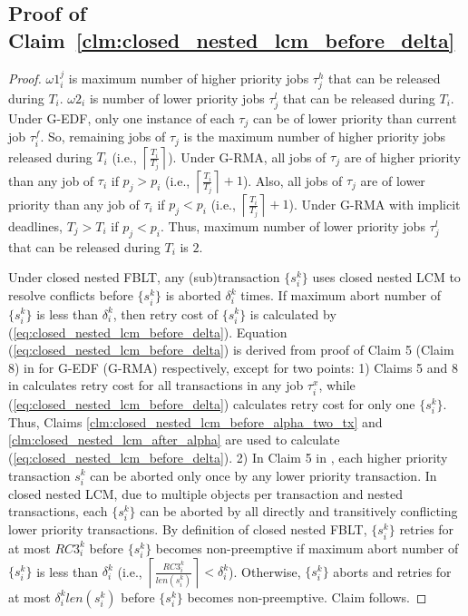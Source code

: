 \documentclass[letter]{sig-alternate}
\begin{document}
\subsection{\label{proof_clm:closed_nested_lcm_before_delta}Proof of Claim~\ref{clm:closed_nested_lcm_before_delta}}

\begin{proof}

$\omega1_{i}^{j}$ is maximum number of higher priority jobs $\tau_{j}^{h}$
that can be released during $T_{i}$. $\omega2_{i}$ is number of
lower priority jobs $\tau_{j}^{l}$ that can be released during $T_{i}$.
Under G-EDF, only one instance of each $\tau_{j}$ can be of lower
priority than current job $\tau_{i}^{f}$. So, remaining jobs of $\tau_{j}$
is the maximum number of higher priority jobs released during $T_{i}$
(i.e., $\left\lceil \frac{T_{i}}{T_{j}}\right\rceil $). Under G-RMA,
all jobs of $\tau_{j}$ are of higher priority than any job of $\tau_{i}$
if $p_{j}>p_{i}$ (i.e., $\left\lceil \frac{T_{i}}{T_{j}}\right\rceil +1$).
Also, all jobs of $\tau_{j}$ are of lower priority than any job of
$\tau_{i}$ if $p_{j}<p_{i}$ (i.e., $\left\lceil \frac{T_{i}}{T_{j}}\right\rceil +1$).
Under G-RMA with implicit deadlines, $T_{j}>T_{i}$ if $p_{j}<p_{i}$.
Thus, maximum number of lower priority jobs $\tau_{j}^{l}$ that can
be released during $T_{i}$ is $2$.

Under closed nested FBLT, any (sub)transaction $\{s_{i}^{k}\}$ uses
closed nested LCM to resolve conflicts before $\{s_{i}^{k}\}$ is
aborted $\delta_{i}^{k}$ times. If maximum abort number of $\{s_{i}^{k}\}$
is less than $\delta_{i}^{k}$, then retry cost of $\{s_{i}^{k}\}$
is calculated by (\ref{eq:closed_nested_lcm_before_delta}). Equation
(\ref{eq:closed_nested_lcm_before_delta}) is derived from proof of
Claim 5 (Claim 8) in \cite{lcmdac2012} for G-EDF (G-RMA) respectively,
except for two points: 1) Claims 5 and 8 in \cite{lcmdac2012} calculates
retry cost for all transactions in any job $\tau_{i}^{x}$, while
(\ref{eq:closed_nested_lcm_before_delta}) calculates retry cost for
only one $\{s_{i}^{k}\}$. Thus, Claims \ref{clm:closed_nested_lcm_before_alpha_two_tx}
and \ref{clm:closed_nested_lcm_after_alpha} are used to calculate
(\ref{eq:closed_nested_lcm_before_delta}). 2) In Claim 5 in \cite{lcmdac2012},
each higher priority transaction $s_{i}^{k}$ can be aborted only
once by any lower priority transaction. In closed nested LCM, due
to multiple objects per transaction and nested transactions, each
$\{s_{i}^{k}\}$ can be aborted by all directly and transitively conflicting
lower priority transactions. By definition of closed nested FBLT,
$\{s_{i}^{k}\}$ retries for at most $RC3_{i}^{k}$ before $\{s_{i}^{k}\}$
becomes non-preemptive if maximum abort number of $\{s_{i}^{k}\}$
is less than $\delta_{i}^{k}$ (i.e., $\left\lceil \frac{RC3_{i}^{k}}{len\left(s_{i}^{k}\right)}\right\rceil <\delta_{i}^{k}$).
Otherwise, $\{s_{i}^{k}\}$ aborts and retries for at most $\delta_{i}^{k}len\left(s_{i}^{k}\right)$
before $\{s_{i}^{k}\}$ becomes non-preemptive. Claim follows.

\end{proof}
\end{document}
